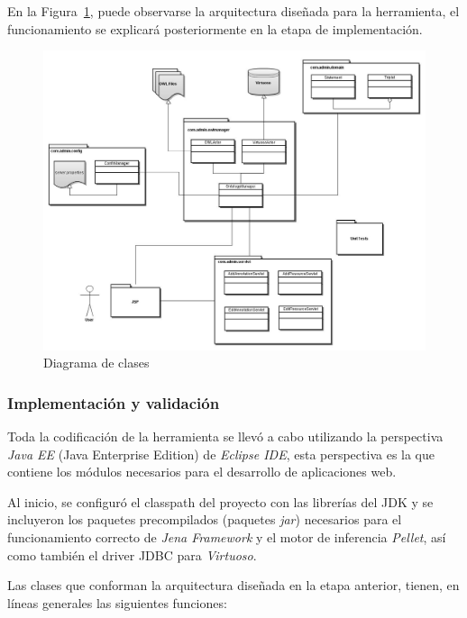 \begin{itemize}
En la Figura~\ref{adminClassDiagram}, puede observarse la arquitectura diseñada para la herramienta, el funcionamiento se explicará posteriormente en la etapa de implementación.

\newpage

\begin{figure}[!h]
    \begin{center}
        \includegraphics[scale=0.4]{images/admin_app_class_diagram.jpg}
        \caption{Diagrama de clases}
        \label{adminClassDiagram}
    \end{center}
\end{figure}

\subsubsection{Implementación y validación}
Toda la codificación de la herramienta se llevó a cabo utilizando la perspectiva \textit{Java EE} (Java Enterprise Edition) de \textit{Eclipse IDE}, esta perspectiva es la que contiene los módulos necesarios para el desarrollo de aplicaciones web.

Al inicio, se configuró el classpath del proyecto con las librerías del JDK y se incluyeron los paquetes precompilados (paquetes \textit{jar}) necesarios para el funcionamiento correcto de \textit{Jena Framework} y el motor de inferencia \textit{Pellet}, así como también el driver JDBC para \textit{Virtuoso}. 

Las clases que conforman la arquitectura diseñada en la etapa anterior, tienen, en líneas generales las siguientes funciones:


\end{itemize}
